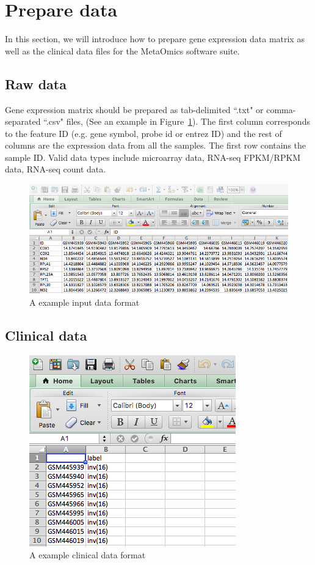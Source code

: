 
\section{Prepare data}
\label{sec:dataPrepare}
In this section, we will introduce how to prepare gene expression data matrix as well as the clinical data files for the MetaOmics software suite.

\subsection{Raw data}

Gene expression matrix should be prepared as tab-delimited ``.txt" or comma-separated ``.csv" files, (See an example in Figure~\ref{fig:dataMicroarray}).
The first column corresponds to the feature ID (e.g. gene symbol, probe id or entrez ID) and the rest of columns are the expression data from all the samples.
The first row contains the sample ID.
Valid data types include microarray data, RNA-seq FPKM/RPKM data, RNA-seq count data.

\begin{figure}[H]
\begin{center}
\includegraphics[scale=0.5]{./figure/dataPreparation/dataMicroarray_wide}
\caption{A example input data format}
\label{fig:dataMicroarray}
\end{center}
\end{figure}

\subsection{Clinical data}

\begin{figure}
\includegraphics[scale=0.5]{./figure/dataPreparation/clinicalData}
\caption{A example clinical data format}
\label{fig:clinical}
\end{figure}

